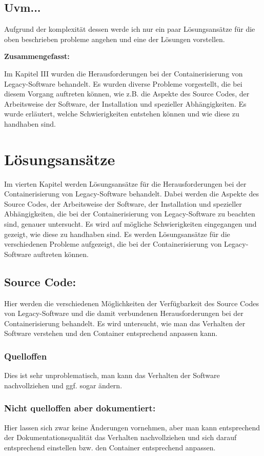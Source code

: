 \subsection{Uvm...}
Aufgrund der komplexität dessen werde ich nur ein paar Lösungsansätze für die oben beschrieben probleme angehen und eine der Lösungen vorstellen.

\textbf{Zusammengefasst:}

Im Kapitel III wurden die Herausforderungen bei der Containerisierung von Legacy-Software behandelt. Es wurden diverse Probleme vorgestellt, die bei diesem Vorgang auftreten können, wie z.B. die Aspekte des Source Codes, der Arbeitsweise der Software, der Installation und spezieller Abhängigkeiten. Es wurde erläutert, welche Schwierigkeiten entstehen können und wie diese zu handhaben sind.

\section{Lösungsansätze}
Im vierten Kapitel werden Lösungsansätze für die Herausforderungen bei der Containerisierung von Legacy-Software behandelt. Dabei werden die Aspekte des Source Codes, der Arbeitsweise der Software, der Installation und spezieller Abhängigkeiten, die bei der Containerisierung von Legacy-Software zu beachten sind, genauer untersucht. Es wird auf mögliche Schwierigkeiten eingegangen und gezeigt, wie diese zu handhaben sind. Es werden Lösungsansätze für die verschiedenen Probleme aufgezeigt, die bei der Containerisierung von Legacy-Software auftreten können.
\subsection{Source Code:}
Hier werden die verschiedenen Möglichkeiten der Verfügbarkeit des Source Codes von Legacy-Software und die damit verbundenen Herausforderungen bei der Containerisierung behandelt.
Es wird untersucht, wie man das Verhalten der Software verstehen und den Container entsprechend anpassen kann.
\subsubsection{Quelloffen}
Dies ist sehr unproblematisch, man kann das Verhalten der Software nachvollziehen und ggf. sogar ändern.

\subsubsection{Nicht quelloffen aber dokumentiert:}
Hier lassen sich zwar keine Änderungen vornehmen, aber man kann entsprechend der Dokumentationsqualität das Verhalten nachvollziehen und sich darauf entsprechend einstellen bzw. den Container entsprechend anpassen.

